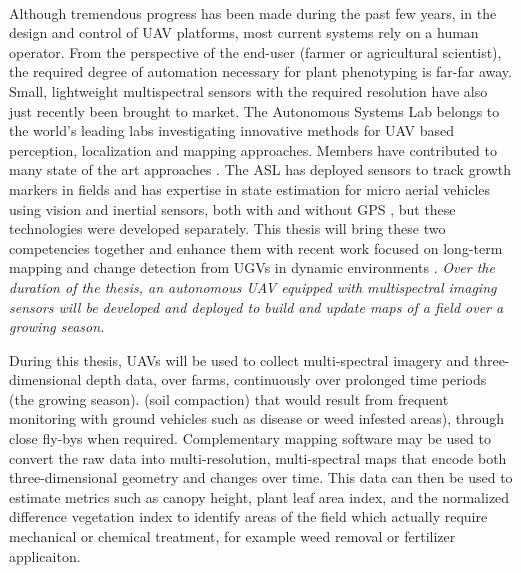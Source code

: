 \paragraph{}
Although tremendous progress has been made during the past few years, in the design and control of UAV platforms, most current systems rely on a human operator. From the perspective of the end-user (farmer or agricultural scientist), the required degree of automation necessary for plant phenotyping is far-far away. Small, lightweight multispectral sensors with the required resolution have also just recently been brought to market. The Autonomous Systems Lab belongs to the world's leading labs investigating innovative methods for UAV based perception, localization and mapping approaches. Members have contributed to many state of the art approaches \cite{steder2008visual,weiss2012real,weiss2012versatile,leutenegger_rss13}. The ASL has deployed sensors to track growth markers in fields \cite{mielewczik2013diel,walter2012advanced} and has expertise in state estimation for micro aerial vehicles using vision and inertial sensors, both with and without GPS \cite{weiss13monocular,leutenegger_rss13}, but these technologies were developed separately. This thesis will bring these two competencies together and enhance them with recent work focused on long-term mapping and change detection from UGVs in dynamic environments \cite{pomerleau_icra14}. {\em Over the duration of the thesis, an autonomous UAV equipped with multispectral imaging sensors will be developed and deployed to build and update maps of a field over a growing season.}


\iffalse

During this thesis, UAVs will be used to collect multi-spectral imagery and three-dimensional depth data, over farms, continuously over prolonged time periods (the growing season). (soil compaction) that would result from frequent monitoring with ground vehicles such as disease or weed infested areas), through close fly-bys when required. Complementary mapping software may be used to convert the raw data into multi-resolution, multi-spectral maps that encode both three-dimensional geometry and changes over time. This data can then be used to estimate metrics such as canopy height, plant leaf area index, and the normalized difference vegetation index to identify areas of the field which actually require mechanical or chemical treatment, for example weed removal or fertilizer applicaiton.



